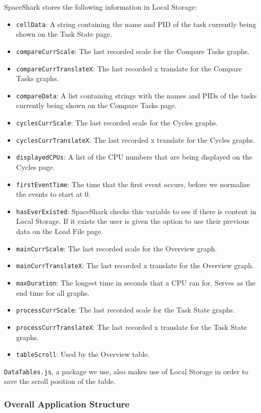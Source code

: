 \documentclass{hmcclinic}
\begin{document}
  SpaceShark stores the following information in Local Storage:

\begin{itemize}
  \item \texttt{cellData}: A string containing the name and PID of the task currently being
  shown on the Task State page. 
\item \texttt{compareCurrScale}: The last recorded scale for the Compare Tasks graphs.
\item \texttt{compareCurrTranslateX}: The last recorded x translate for the Compare Tasks
  graphs.
\item \texttt{compareData}: A list containing strings with the names and PIDs of the
  tasks currently being shown on the Compare Tasks page.
\item \texttt{cyclesCurrScale}: The last recorded scale for the Cycles graphs.	
\item \texttt{cyclesCurrTranslateX}: The last recorded x translate for the Cycles graphs.
\item \texttt{displayedCPUs}: A list of the CPU numbers that are being displayed on the
  Cycles page.
\item \texttt{firstEventTime}: The time that the first event occurs, before we
  normalize the events to start at 0.
\item \texttt{hasEverExisted}: SpaceShark checks this variable to see if there
  is content in Local Storage. If it exists the user is given the option to use
  their previous data on the Load File page.	
\item \texttt{mainCurrScale}: The last recorded scale for the Overview graph.	
\item \texttt{mainCurrTranslateX}: The last recorded x translate for the Overview graph.
\item \texttt{maxDuration}: The longest time in seconds that a CPU ran for. Serves as
  the end time for all graphs.
\item \texttt{processCurrScale}: The last recorded scale for the Task State graphs.
\item \texttt{processCurrTranslateX}: The last recorded x translate for the Task State
  graphs.
\item \texttt{tableScroll}: Used by the Overview table.
\end{itemize}
\texttt{DataTables.js}, a package we use, also makes use of Local Storage in order to save the scroll position of the table.

  \subsubsection{Overall Application Structure}
\end{document}
